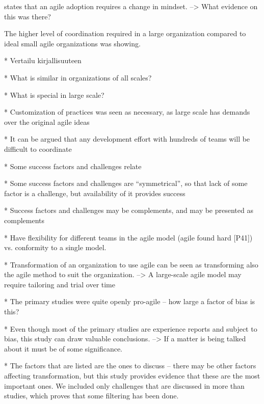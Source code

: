 

\citet{Misra2010} states that an agile adoption requires a change in mindset.
--> What evidence on this was there?

The higher level of coordination required in a large organization compared to
ideal small agile organizations was showing.

* Vertailu kirjallisuuteen

* What is similar in organizations of all scales?

* What is special in large scale?

* Customization of practices was seen as necessary, as large scale has demands
  over the original agile ideas

* It can be argued that any development effort with hundreds of teams will be
  difficult to coordinate


* Some success factors and challenges relate

* Some success factors and challenges are ``symmetrical'', so that lack of some
  factor is a challenge, but availability of it provides success

* Success factors and challenges may be complements, and may be presented as
  complements

* Have flexibility for different teams in the agile model (agile found
  hard [P41]) vs. conformity to a single model. 


* Transformation of an organization to use agile can be seen as transforming
  also the agile method to suit the organization.
  --> A large-scale agile model may require tailoring and trial over time


* The primary studies were quite openly pro-agile -- how large a factor of bias
  is this?

* Even though most of the primary studies are experience reports and subject to
  bias, this study can draw valuable conclusions. --> If a matter is being
  talked about it must be of some significance.

* The factors that are listed are the ones to discuss -- there may be other
  factors affecting transformation, but this study provides evidence that these
  are the most important ones. We included only challenges that are discussed in
  more than studies, which proves that some filtering has been done.

